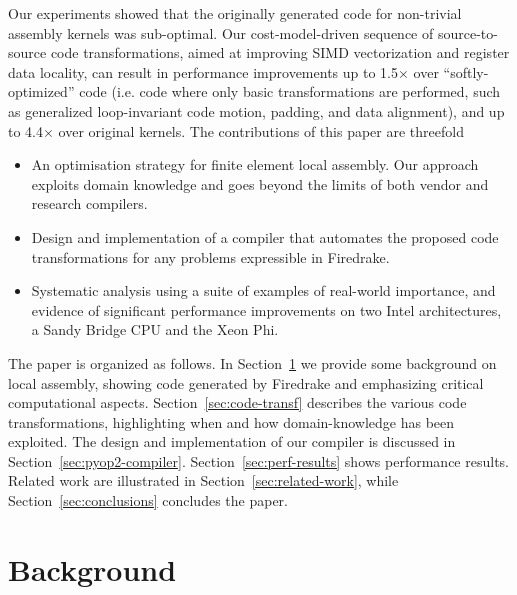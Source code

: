 \documentclass[conference]{IEEEtran}
\begin{document}
Our experiments showed that the originally generated code for non-trivial assembly kernels was sub-optimal. Our cost-model-driven sequence of source-to-source code transformations, aimed at improving SIMD vectorization and register data locality, can result in performance improvements up to 1.5$\times$ over ``softly-optimized'' code (i.e. code where only basic transformations are performed, such as generalized loop-invariant code motion, padding, and data alignment), and up to 4.4$\times$ over original kernels. The contributions of this paper are threefold
\begin{itemize}
\item An optimisation strategy for finite element local assembly. Our approach exploits domain knowledge and goes beyond the limits of both vendor and research compilers.
\item Design and implementation of a compiler that automates the proposed code transformations for any problems expressible in Firedrake.
\item Systematic analysis using a suite of examples of real-world importance, and evidence of significant performance improvements on two Intel architectures, a Sandy Bridge CPU and the Xeon Phi.
\end{itemize}

The paper is organized as follows. In Section~\ref{sec:background} we provide some background on local assembly, showing code generated by Firedrake and emphasizing critical computational aspects. Section~\ref{sec:code-transf} describes the various code transformations, highlighting when and how domain-knowledge has been exploited. The design and implementation of our compiler is discussed in Section~\ref{sec:pyop2-compiler}. Section~\ref{sec:perf-results} shows performance results. Related work are illustrated in Section~\ref{sec:related-work}, while Section~\ref{sec:conclusions} concludes the paper.



\section{Background}
\label{sec:background}
\end{document}
